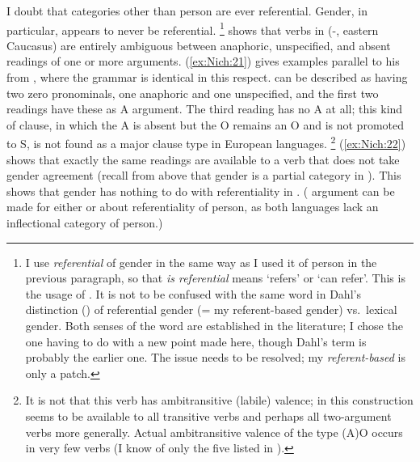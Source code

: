 \documentclass[output=collectionpaper]{langsci/langscibook}
\begin{document}
I doubt that categories other than person are ever referential.  Gender, in particular, appears to never be referential.%
\footnote{%
\label{fn:Nich:15}
I use \textit{referential} of gender in the same way as I used it of person in the previous paragraph, so that \textit{is referential} means `refers' or `can refer'.  This is the usage of \citet{Kibrik2011}.  It is not to be confused with the same word in Dahl's distinction (\citealt*{Dahl2000a}) of referential gender (= my referent-based gender) vs.\ lexical gender.  Both senses of the word are established in the literature; I chose the one having to do with a new point made here, though Dahl's term is probably the earlier one.  The issue needs to be resolved; my \textit{referent-based} is only a patch.
} %
\citet{Creissels2014b} shows that verbs in  (-, eastern Caucasus) are entirely ambiguous between anaphoric, unspecified, and absent readings of one or more arguments. (\ref{ex:Nich:21}) gives examples parallel to his from , where the grammar is identical in this respect.  can be described as having two zero pronominals, one anaphoric and one unspecified, and the first two readings have these as A argument. The third reading has no A at all; this kind of clause, in which the A is absent but the O remains an O and is not promoted to S, is not found as a major clause type in European languages.%
\footnote{%
It is not that this verb has ambitransitive (labile) valence; in  this construction seems to be available to all transitive verbs and perhaps all two-argument verbs more generally. Actual ambitransitive valence of the type (A)O occurs in very few  verbs (I know of only the five listed in \citealt[466--467]{Nichols2011}).
} %
(\ref{ex:Nich:22}) shows that exactly the same readings are available to a verb that does not take gender agreement (recall from above that gender is a partial category in ).  This shows that gender has nothing to do with referentiality in . ( argument can be made for either  or  about referentiality of person, as both languages lack an inflectional category of person.)
\end{document}
